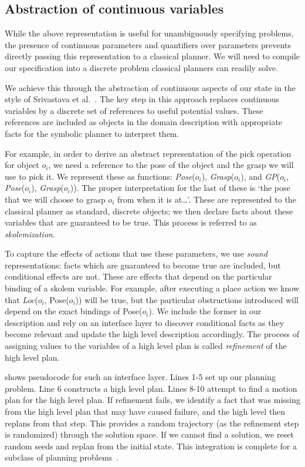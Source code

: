 \subsection{Abstraction of continuous variables}
While the above representation is useful for unambiguously specifying
problems, the presence of continuous parameters and quantifiers over
parameters prevents directly passing this representation to a
classical planner. We will need to compile our specification into a
discrete problem classical planners can readily solve.

We achieve this through the abstraction of continuous aspects of our
state in the style of Srivastava et
al.~\cite{srivastava2014combined}. The key step in this approach
replaces continuous variables by a discrete set of references to useful
potential values. These references are included as objects in
the domain description with appropriate facts for the symbolic planner
to interpret them.

For example, in order to derive an abstract representation of the pick
operation for object $o_i$, we need a reference to the pose of the
object and the grasp we will use to pick it. We represent these as
functions: \emph{Pose}($o_i$), \emph{Grasp}($o_i$), and
\emph{GP}($o_i$, \emph{Pose}($o_i$), \emph{Grasp}($o_i$)). The proper
interpretation for the last of these is `the pose that we will choose
to grasp $o_i$ from when it is at\ldots'. These are represented to the classical planner
as standard, discrete objects; we then declare facts about
these variables that are guaranteed to be true. This process is
referred to as \emph{skolemization}.

To capture the effects of actions that use these parameters, we use
\emph{sound} representations: facts which are guaranteed to become
true are included, but conditional effects are not. These are effects
that depend on the particular binding of a skolem variable. For
example, after executing a place action we know that \emph{Loc}($o_i$,
Pose($o_i$)) will be true, but the particular obstructions introduced
will depend on the exact bindings of Pose($o_i$). We include the
former in our description and rely on an interface layer to discover
conditional facts as they become relevant and update the high level
description accordingly. The process of assigning values to the variables
of a high level plan is called \emph{refinement} of the high level
plan.

 shows pseudocode for such an interface layer. Lines
1-5 set up our planning problem. Line 6 constructs a high level
plan. Lines 8-10 attempt to find a motion plan for the high level
plan. If refinement fails, we identify a fact that was missing from
the high level plan that may have caused failure, and the high level then
replans from that step. This provides a random trajectory (as the
refinement step is randomized) through the solution space. If we cannot
find a solution, we reset random seeds and replan from the initial
state. This integration is complete for a subclass of planning
problems~\cite{srivastava2014combined}.

